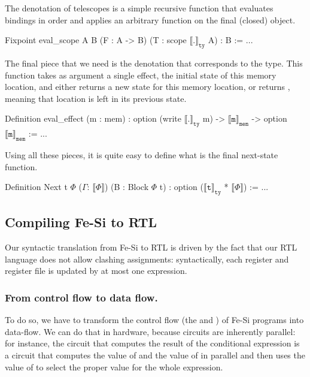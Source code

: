 \documentclass{llncs}
\newcommand{\denote}[1]{\llbracket #1 \rrbracket}
\newcommand{\denotety}[1]{\denote{\mathtt{#1}}_{\mathtt{ty}}}
\newcommand{\denotemem}[1]{\denote{\mathtt{#1}}_{\mathtt{mem}}}
\begin{document}
\noindent The denotation of telescopes is a simple recursive function that
evaluates bindings in order and applies an arbitrary function on the
final (closed) object.
\begin{mcoq}
Fixpoint eval_scope {A B} (F : A -> B) (T : scope $\denotety{.}$ A) : B := ...
\end{mcoq}
%
The final piece that we need is the denotation that corresponds to the
 type. This function takes as argument a single effect,
the initial state of this memory location,  and either returns a new
state for this memory location, or returns , meaning that
location is left in its previous state.
\begin{mcoq}
Definition eval_effect (m : mem) : option (write $\denotety{.}$ m) -> $\denotemem{m}$ -> option $\denotemem{m}$ := ... 
\end{mcoq}
%
Using all these pieces, it is quite easy to define what is the final
next-state function. 
\begin{mcoq}
Definition Next {t} {$\Phi$} ($\Gamma$: $\denote{\Phi}$) (B : Block $\Phi$ t) : option ($\denotety{t}$ * $\denote{\Phi}$) := ...
\end{mcoq}

\subsection{Compiling Fe-Si to RTL} 
Our syntactic translation from Fe-Si to RTL is driven by the fact that
our RTL language does not allow clashing assignments: syntactically,
each register and register file is updated by at most one 
expression.

\subsubsection{From control flow to data flow.}To do so, we have to
transform the control flow (the  and ) of
Fe-Si programs into data-flow.
%
We can do that in hardware, because circuits are inherently parallel:
for instance, the circuit that computes the result of the conditional
expression \mbox{} is a circuit that computes the
value of  and the value of  in parallel and then uses
the value of  to select the proper value for the whole
expression.
\end{document}
